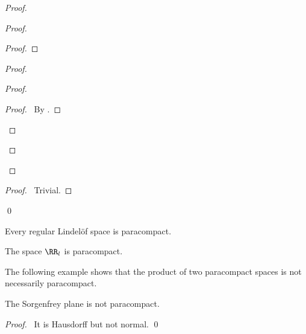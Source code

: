 \begin{proof}
\begin{proof}
\begin{proof}
        \end{proof}
        \begin{proof}
            \begin{proof}
                \qedstep
                \begin{proof}
                    \pf\ By .
                \end{proof}
            \end{proof}
        \end{proof}
    \end{proof}
    \begin{proof}
        \pf\ Trivial.
    \end{proof}
    \qed
\end{proof}

\begin{corollary}
    \label{corollary:regular_Lindelof_paracompact}
    Every regular Lindel\"{o}f space is paracompact.
\end{corollary}

\begin{corollary}
    The space $\RR_l$ is paracompact.
\end{corollary}

The following example shows that the product of two paracompact spaces is not necessarily paracompact.

\begin{proposition}
    The Sorgenfrey plane is not paracompact.
\end{proposition}

\begin{proof}
    \pf\ It is Hausdorff but not normal. \qed
\end{proof}

